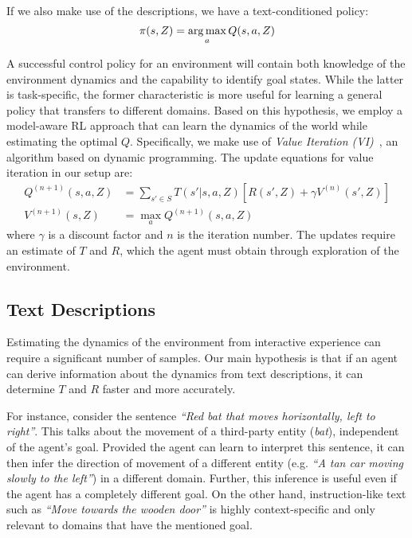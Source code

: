 If we also make use of the descriptions, we have a text-conditioned policy: 
\begin{dmath}
\pi(s, Z) = \argmax_a Q(s, a, Z)
\end{dmath} 

A successful control policy for an environment will contain both knowledge of  the environment dynamics and the capability to identify goal states. While the latter is task-specific, the former characteristic is more useful for learning a general policy that transfers to different domains. Based on this hypothesis, we employ a model-aware RL approach that can learn the dynamics of the world while estimating the optimal $Q$. Specifically, we make use of \emph{Value Iteration (VI)}~\cite{sutton1998introduction}, an algorithm based on dynamic programming. The update equations for value iteration in our setup are:
\begin{align}
Q^{(n+1)}(s, a, Z) &= \sum_{s' \in S} T(s' | s, a, Z) [ R(s', Z) + \gamma V^{(n)}(s', Z) ]  \nonumber \\
V^{(n+1)}(s, Z) &= \max_a Q^{(n+1)}(s,a, Z) 
\label{eq:vi}
\end{align}
where $\gamma$ is a discount factor and $n$ is the iteration number. The updates require an estimate of $T$ and $R$, which the agent must obtain through exploration of the environment.


\subsection{Text Descriptions}
Estimating the dynamics of the environment from interactive experience can require a significant number of samples. Our main hypothesis is that if an agent can derive information about the dynamics from text descriptions, it can determine $T$ and $R$ faster and more accurately. 

For instance, consider the sentence \emph{``Red bat that moves horizontally, left to right''}. This talks about the movement of a third-party entity (\emph{bat}), independent of the agent's goal. Provided the agent can learn to interpret this sentence, it can then infer the direction of movement of a different entity (e.g. \emph{``A tan car moving slowly to the left''}) in a different domain. Further, this inference is useful even if the agent has a completely different goal. On the other hand, instruction-like text such as \emph{``Move towards the wooden door''} is highly context-specific and only relevant to domains that have the mentioned goal.

